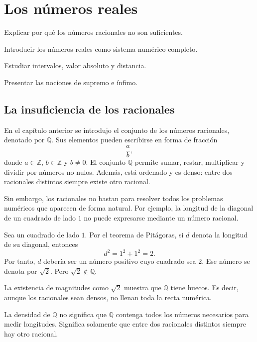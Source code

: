 \chapter{Los n\'umeros reales}

\begin{objetivos}
  \item Explicar por qu\'e los n\'umeros racionales no son suficientes.
  \item Introducir los n\'umeros reales como sistema num\'erico completo.
  \item Estudiar intervalos, valor absoluto y distancia.
  \item Presentar las nociones de supremo e \'infimo.
\end{objetivos}

\section{La insuficiencia de los racionales}

En el cap\'itulo anterior se introdujo el conjunto de los n\'umeros racionales, denotado por
\(\mathbb{Q}\). Sus elementos pueden escribirse en forma de fracci\'on
\[
  \frac{a}{b},
\]
donde \(a\in \mathbb{Z}\), \(b\in \mathbb{Z}\) y \(b\neq 0\). El conjunto \(\mathbb{Q}\) permite sumar, restar, multiplicar y dividir por n\'umeros no nulos. Adem\'as, est\'a ordenado y es denso: entre dos racionales distintos siempre existe otro racional.

Sin embargo, los racionales no bastan para resolver todos los problemas num\'ericos que aparecen de forma natural. Por ejemplo, la longitud de la diagonal de un cuadrado de lado \(1\) no puede expresarse mediante un n\'umero racional.

\begin{ejemplo}
Sea un cuadrado de lado \(1\). Por el teorema de Pit\'agoras, si \(d\) denota la longitud de su diagonal, entonces
\[
  d^2=1^2+1^2=2.
\]
Por tanto, \(d\) deber\'ia ser un n\'umero positivo cuyo cuadrado sea \(2\). Ese n\'umero se denota por \(\sqrt{2}\). Pero \(\sqrt{2}\notin\mathbb{Q}\).
\end{ejemplo}

La existencia de magnitudes como \(\sqrt{2}\) muestra que \(\mathbb{Q}\) tiene huecos. Es decir, aunque los racionales sean densos, no llenan toda la recta num\'erica.

\begin{advertencia}
La densidad de \(\mathbb{Q}\) no significa que \(\mathbb{Q}\) contenga todos los n\'umeros necesarios para medir longitudes. Significa solamente que entre dos racionales distintos siempre hay otro racional.
\end{advertencia}


